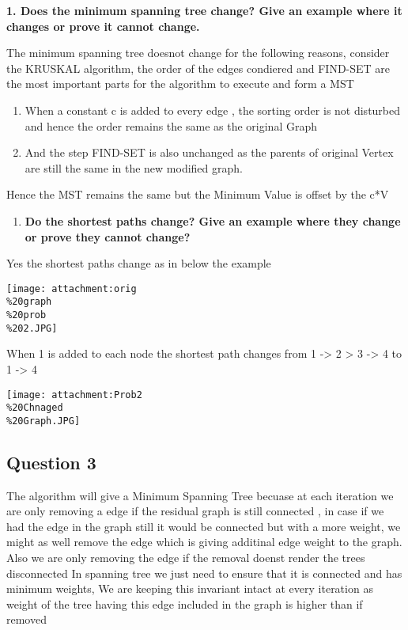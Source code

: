 \documentclass[11pt]{article}
\makeatletter
\def\maxwidth{\ifdim\Gin@nat@width>\linewidth\linewidth
    \else\Gin@nat@width\fi}
\let\Oldincludegraphics\includegraphics
\renewcommand{\includegraphics}[1]{\Oldincludegraphics[width=.8\maxwidth]{#1}}
\providecommand{\tightlist}{%
      \setlength{\itemsep}{0pt}\setlength{\parskip}{0pt}}
\makeatother
\begin{document}
\textbf{1. Does the minimum spanning tree change? Give an example where
it changes or prove it cannot change. }

    The minimum spanning tree doesnot change for the following reasons,
consider the KRUSKAL algorithm, the order of the edges condiered and
FIND-SET are the most important parts for the algorithm to execute and
form a MST

\begin{enumerate}
\def\labelenumi{\arabic{enumi}.}
\tightlist
\item
  When a constant c is added to every edge , the sorting order is not
  disturbed and hence the order remains the same as the original Graph
\item
  And the step FIND-SET is also unchanged as the parents of original
  Vertex are still the same in the new modified graph.
\end{enumerate}

Hence the MST remains the same but the Minimum Value is offset by the
c*V

    \begin{enumerate}
\def\labelenumi{\arabic{enumi}.}
\setcounter{enumi}{1}
\tightlist
\item
  \textbf{Do the shortest paths change? Give an example where they
  change or prove they cannot change?}
\end{enumerate}

Yes the shortest paths change as in below the example

\texttt{[image: attachment:orig\\\%20graph\\\%20prob\\\%202.JPG]}

    When 1 is added to each node the shortest path changes from 1
-\textgreater{} 2 \textgreater{} 3 -\textgreater{} 4 to 1
-\textgreater{} 4

    \texttt{[image: attachment:Prob2\\\%20Chnaged\\\%20Graph.JPG]}

    \subsection{Question 3}\label{question-3}

    The algorithm will give a Minimum Spanning Tree becuase at each
iteration we are only removing a edge if the residual graph is still
connected , in case if we had the edge in the graph still it would be
connected but with a more weight, we might as well remove the edge which
is giving additinal edge weight to the graph. Also we are only removing
the edge if the removal doenst render the trees disconnected In spanning
tree we just need to ensure that it is connected and has minimum
weights, We are keeping this invariant intact at every iteration as
weight of the tree having this edge included in the graph is higher than
if removed
\end{document}

